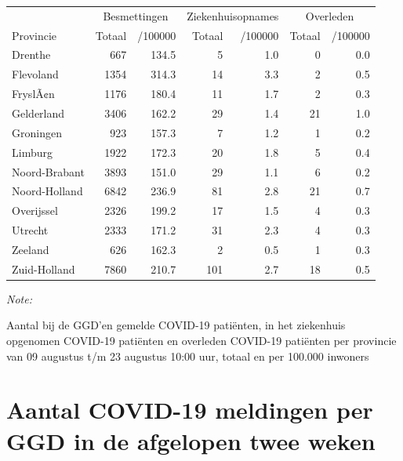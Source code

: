 \documentclass[
  english,
  man,floatsintext]{apa6}
\begin{document}
\begin{table}
\centering
\begin{threeparttable}
\begin{tabular}{lrrrrrr}
\toprule
\multicolumn{1}{c}{ } & \multicolumn{2}{c}{Besmettingen} & \multicolumn{2}{c}{Ziekenhuisopnames} & \multicolumn{2}{c}{Overleden} \\
\cmidrule(l{3pt}r{3pt}){2-3} \cmidrule(l{3pt}r{3pt}){4-5} \cmidrule(l{3pt}r{3pt}){6-7}
Provincie & Totaal & /100000 & Totaal & /100000 & Totaal & /100000\\
\midrule
Drenthe & 667 & 134.5 & 5 & 1.0 & 0 & 0.0\\
Flevoland & 1354 & 314.3 & 14 & 3.3 & 2 & 0.5\\
FryslÃ¢n & 1176 & 180.4 & 11 & 1.7 & 2 & 0.3\\
Gelderland & 3406 & 162.2 & 29 & 1.4 & 21 & 1.0\\
Groningen & 923 & 157.3 & 7 & 1.2 & 1 & 0.2\\
Limburg & 1922 & 172.3 & 20 & 1.8 & 5 & 0.4\\
Noord-Brabant & 3893 & 151.0 & 29 & 1.1 & 6 & 0.2\\
Noord-Holland & 6842 & 236.9 & 81 & 2.8 & 21 & 0.7\\
Overijssel & 2326 & 199.2 & 17 & 1.5 & 4 & 0.3\\
Utrecht & 2333 & 171.2 & 31 & 2.3 & 4 & 0.3\\
Zeeland & 626 & 162.3 & 2 & 0.5 & 1 & 0.3\\
Zuid-Holland & 7860 & 210.7 & 101 & 2.7 & 18 & 0.5\\
\bottomrule
\end{tabular}
\begin{tablenotes}
\item \textit{Note: } 
\item Aantal bij de GGD’en gemelde COVID-19 patiënten, in het ziekenhuis opgenomen COVID-19 patiënten en overleden COVID-19 patiënten per provincie van 09 augustus t/m 23 augustus 10:00 uur, totaal en per 100.000 inwoners
\end{tablenotes}
\end{threeparttable}
\end{table}

\newpage

\hypertarget{aantal-covid-19-meldingen-per-ggd-in-de-afgelopen-twee-weken}{%
\section{Aantal COVID-19 meldingen per GGD in de afgelopen twee weken}\label{aantal-covid-19-meldingen-per-ggd-in-de-afgelopen-twee-weken}}
\end{document}
